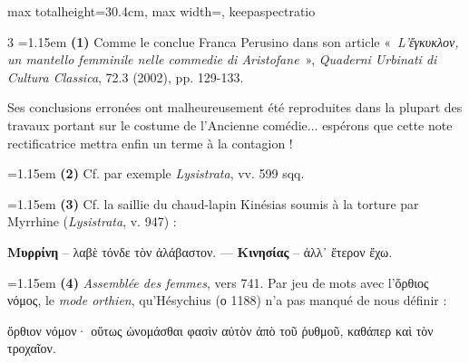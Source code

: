 \documentclass[11pt,twoside]{book}
\newcommand{\italique}[1]{\textit{#1}}
\newcommand{\citComm}[1]{\begin{quoting}[vskip=0.4pt,leftmargin=0.7em,rightmargin=0.2em]#1\end{quoting}}
\newcommand{\italien}[1]{\textit{#1}}
\begin{document}
\begin{adjustbox}{max totalheight=30.4cm, max width=\textwidth, keepaspectratio}
\begin{minipage}{\textwidth}
{\begin{multicols}{3}
\noindent\hangindent=1.15em {\color{sepiaNote}\textbf{(1)}} Comme le conclue Franca Perusino dans son article «~\italien{L'ἔγκυκλον, un mantello femminile nelle commedie di Aristofane}~», \italique{Quaderni Urbinati di Cultura Classica}, 72.3 (2002), pp. 129-133.
\par\vspace{1.5pt}
\noindent Ses conclusions erronées ont malheureusement été reproduites dans la plupart des travaux portant sur le costume de l'Ancienne comédie... espérons que cette note rectificatrice mettra enfin un terme à la contagion !
\par\vspace{1.5pt}
\noindent\hangindent=1.15em {\color{sepiaNote}\textbf{(2)}} Cf. par exemple \italique{Lysistrata}, vv. 599 sqq.
\par\vspace{1.5pt}
\noindent\hangindent=1.15em {\color{sepiaNote}\textbf{(3)}} Cf. la saillie du chaud-lapin Kinésias soumis à la torture par Myrrhine (\italique{Lysistrata}, v. 947) :
\citComm{\textbf{Μυρρίνη} -- λαβὲ τόνδε τὸν ἀλάβαστον. --- \textbf{Κινησίας} -- ἀλλ᾽ ἕτερον ἔχω.}
\par\vspace{1.5pt}
\noindent\hangindent=1.15em {\color{sepiaNote}\textbf{(4)}} \italique{Assemblée des femmes}, vers 741. Par jeu de mots avec l'ὄρθιος νόμος, le \italique{mode orthien}, qu'Hésychius (ο 1188) n'a pas manqué de nous définir :
\citComm{ὄρθιον νόμον· οὕτως ὠνομάσθαι φασὶν αὐτὸν ἀπὸ τοῦ ῥυθμοῦ, καθάπερ καὶ τὸν τροχαῖον.}
\par\end{multicols}}
\end{minipage}\end{adjustbox}
\newpage
\end{document}

